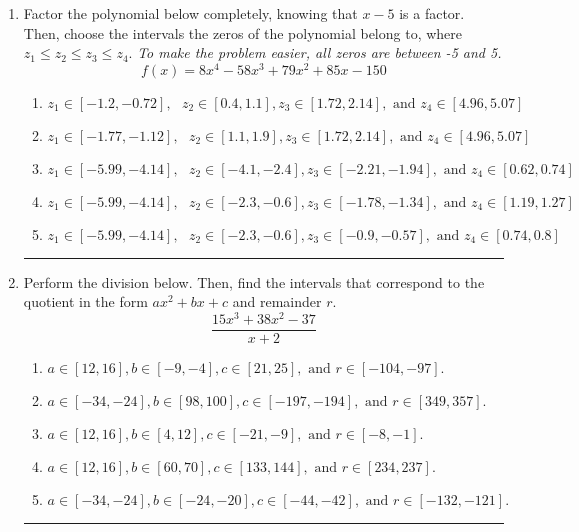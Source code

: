 \documentclass[14pt]{extbook}
\newcommand{\litem}[1]{\item#1\hspace*{-1cm}\rule{\textwidth}{0.4pt}}
\begin{document}
\begin{enumerate}
{\begin{enumerate}[label=\Alph*.]
\end{enumerate} }
\litem{
Factor the polynomial below completely, knowing that $x-5$ is a factor. Then, choose the intervals the zeros of the polynomial belong to, where $z_1 \leq z_2 \leq z_3 \leq z_4$. \textit{To make the problem easier, all zeros are between -5 and 5.}\[ f(x) = 8x^{4} -58 x^{3} +79 x^{2} +85 x -150 \]\begin{enumerate}[label=\Alph*.]
\item \( z_1 \in [-1.2, -0.72], \text{   }  z_2 \in [0.4, 1.1], z_3 \in [1.72, 2.14], \text{   and   } z_4 \in [4.96, 5.07] \)
\item \( z_1 \in [-1.77, -1.12], \text{   }  z_2 \in [1.1, 1.9], z_3 \in [1.72, 2.14], \text{   and   } z_4 \in [4.96, 5.07] \)
\item \( z_1 \in [-5.99, -4.14], \text{   }  z_2 \in [-4.1, -2.4], z_3 \in [-2.21, -1.94], \text{   and   } z_4 \in [0.62, 0.74] \)
\item \( z_1 \in [-5.99, -4.14], \text{   }  z_2 \in [-2.3, -0.6], z_3 \in [-1.78, -1.34], \text{   and   } z_4 \in [1.19, 1.27] \)
\item \( z_1 \in [-5.99, -4.14], \text{   }  z_2 \in [-2.3, -0.6], z_3 \in [-0.9, -0.57], \text{   and   } z_4 \in [0.74, 0.8] \)

\end{enumerate} }
\litem{
Perform the division below. Then, find the intervals that correspond to the quotient in the form $ax^2+bx+c$ and remainder $r$.\[ \frac{15x^{3} +38 x^{2} -37}{x + 2} \]\begin{enumerate}[label=\Alph*.]
\item \( a \in [12, 16], b \in [-9, -4], c \in [21, 25], \text{ and } r \in [-104, -97]. \)
\item \( a \in [-34, -24], b \in [98, 100], c \in [-197, -194], \text{ and } r \in [349, 357]. \)
\item \( a \in [12, 16], b \in [4, 12], c \in [-21, -9], \text{ and } r \in [-8, -1]. \)
\item \( a \in [12, 16], b \in [60, 70], c \in [133, 144], \text{ and } r \in [234, 237]. \)
\item \( a \in [-34, -24], b \in [-24, -20], c \in [-44, -42], \text{ and } r \in [-132, -121]. \)


\end{enumerate}}
\end{enumerate}
\end{document}
